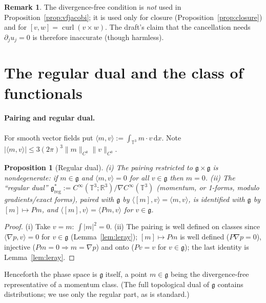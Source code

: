 \documentclass[11pt]{article}
\newtheorem{proposition}[theorem]{Proposition}
\theoremstyle{definition}
\newtheorem{remark}[theorem]{Remark}
\newcommand{\T}{\mathbb{T}^3}
\newcommand{\R}{\mathbb{R}}
\newcommand{\g}{\mathfrak{g}}
\newcommand{\ip}[2]{\langle #1,#2\rangle}
\newcommand{\dd}{\,\mathrm{d}x}
\newcommand{\curl}{\operatorname{curl}}
\begin{document}
\begin{remark}
The divergence-free condition is \emph{not} used in Proposition~\ref{prop:vfjacobi}; it is used only
for closure (Proposition~\ref{prop:closure}) and for $[v,w]=\curl(v\times w)$. The draft's claim that
the cancellation needs $\partial_ju_j=0$ is therefore inaccurate (though harmless).
\end{remark}

\section{The regular dual and the class of functionals}\label{sec:dual}
\paragraph{Pairing and regular dual.} For smooth vector fields put
$\ip{m}{v}:=\int_{\T}m\cdot v\dd$. Note $|\ip{m}{v}|\le 3(2\pi)^3\|m\|_{C^0}\|v\|_{C^0}$.

\begin{proposition}[Regular dual]\label{prop:dual}
(i) The pairing restricted to $\g\times\g$ is nondegenerate: if $m\in\g$ and $\ip{m}{v}=0$ for all
$v\in\g$ then $m=0$. (ii) The ``regular dual'' $\g^*_{\mathrm{reg}}:=C^\infty(\T;\R^3)/\nabla C^\infty(\T)$
(momentum, or 1-forms, modulo gradients/exact forms), paired with $\g$ by $\ip{[m]}{v}=\ip{m}{v}$, is
identified with $\g$ by $[m]\mapsto Pm$, and $\ip{[m]}{v}=\ip{Pm}{v}$ for $v\in\g$.
\end{proposition}
\begin{proof}
(i) Take $v=m$: $\int|m|^2=0$. (ii) The pairing is well defined on classes since
$\ip{\nabla p}{v}=0$ for $v\in\g$ (Lemma~\ref{lem:leray}); $[m]\mapsto Pm$ is well defined
($P\nabla p=0$), injective ($Pm=0\Rightarrow m=\nabla p$) and onto ($Pv=v$ for $v\in\g$); the last
identity is Lemma~\ref{lem:leray}.
\end{proof}
Henceforth the phase space is $\g$ itself, a point $m\in\g$ being the divergence-free representative
of a momentum class. (The full topological dual of $\g$ contains distributions; we use only the
regular part, as is standard.)
\end{document}
